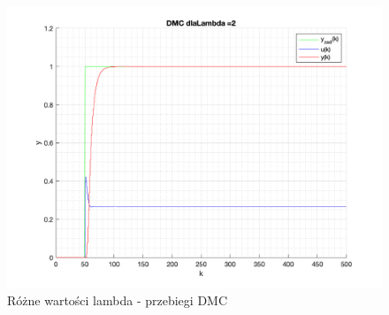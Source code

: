 \documentclass[a4paper, 11pt]{article}
\begin{document}
\begin{enumerate}
 \begin{figure} [h]
\centering
 \includegraphics[width=\linewidth]{./ModelsP4_lambda/P4_DMC_lambda_2_png.png} 
 \caption[Różne wartości lambda - przebiegi DMC]
{Różne wartości lambda - przebiegi DMC}
 \end{figure}
 

\end{enumerate}
\end{document}
